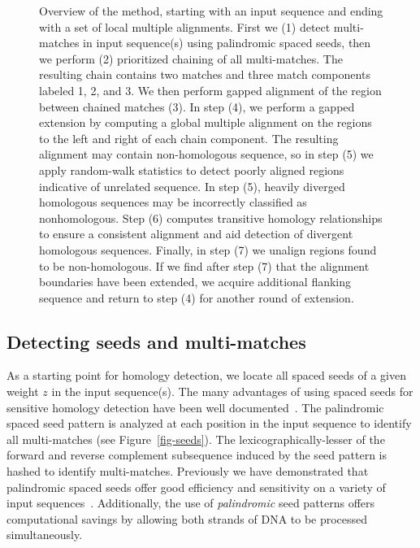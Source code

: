 \documentclass[twoside,11pt]{article}
\begin{document}
\begin{figure}[p]
\begin{center}
\end{center}
\caption{Overview of the method, starting with an input sequence and ending with a set of local multiple alignments. First we (1) detect multi-matches in input sequence(s) using palindromic spaced seeds, then we perform (2) prioritized chaining of all multi-matches.  The resulting chain contains two matches and three match components labeled 1, 2, and 3.  We then perform gapped alignment of the region between chained matches (3).   In step (4), we perform a gapped extension by computing a global multiple alignment on the regions to the left and right of each chain component.  The resulting alignment may contain non-homologous sequence, so in step (5) we apply random-walk statistics to detect poorly aligned regions indicative of unrelated sequence.  In step (5), heavily diverged homologous sequences may be incorrectly classified as nonhomologous.  Step (6) computes transitive homology relationships to ensure a consistent alignment and aid detection of divergent homologous sequences.  Finally, in step (7) we unalign regions found to be non-homologous.  If we find after step (7) that the alignment boundaries have been extended, we acquire additional flanking sequence and return to step (4) for another round of extension.}
\label{fig-main}
\end{figure}



\subsection{Detecting seeds and multi-matches}

As a starting point for homology detection, we locate all spaced seeds of a given weight $z$ in the input sequence(s). The many advantages of using spaced seeds for sensitive homology detection have been well documented~\cite{ref-spacedseeds, ref-pattern}. The palindromic spaced seed pattern is analyzed at each position in the input sequence to identify all multi-matches (see Figure~\ref{fig-seeds}).   The lexicographically-lesser of the forward and reverse complement
subsequence induced by the seed pattern is hashed to identify multi-matches.  Previously we have demonstrated that palindromic spaced seeds offer good efficiency and sensitivity on a variety of input sequences~\cite{ref-procrast}. Additionally, the use of \textit{palindromic} seed patterns offers computational savings by allowing both strands of DNA to be processed simultaneously.
\end{document}
